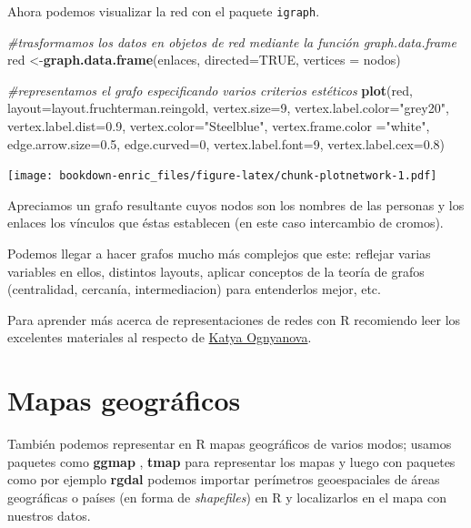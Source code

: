 \documentclass[]{book}
\newenvironment{Shaded}{\begin{snugshade}}{\end{snugshade}}
\newcommand{\KeywordTok}[1]{\textcolor[rgb]{0.13,0.29,0.53}{\textbf{{#1}}}}
\newcommand{\DataTypeTok}[1]{\textcolor[rgb]{0.13,0.29,0.53}{{#1}}}
\newcommand{\DecValTok}[1]{\textcolor[rgb]{0.00,0.00,0.81}{{#1}}}
\newcommand{\FloatTok}[1]{\textcolor[rgb]{0.00,0.00,0.81}{{#1}}}
\newcommand{\StringTok}[1]{\textcolor[rgb]{0.31,0.60,0.02}{{#1}}}
\newcommand{\CommentTok}[1]{\textcolor[rgb]{0.56,0.35,0.01}{\textit{{#1}}}}
\newcommand{\OtherTok}[1]{\textcolor[rgb]{0.56,0.35,0.01}{{#1}}}
\newcommand{\NormalTok}[1]{{#1}}
\theoremstyle{definition}
\theoremstyle{definition}
\theoremstyle{remark}
\begin{document}
Ahora podemos visualizar la red con el paquete \texttt{igraph}.

\begin{Shaded}
\begin{Highlighting}[]
\CommentTok{#trasformamos los datos en objetos de red mediante la función graph.data.frame}
\NormalTok{red <-}\KeywordTok{graph.data.frame}\NormalTok{(enlaces, }\DataTypeTok{directed=}\OtherTok{TRUE}\NormalTok{, }\DataTypeTok{vertices =} \NormalTok{nodos)}

\CommentTok{#representamos el grafo especificando varios criterios estéticos}
\KeywordTok{plot}\NormalTok{(red, }\DataTypeTok{layout=}\NormalTok{layout.fruchterman.reingold, }\DataTypeTok{vertex.size=}\DecValTok{9}\NormalTok{, }
     \DataTypeTok{vertex.label.color=}\StringTok{"grey20"}\NormalTok{, }\DataTypeTok{vertex.label.dist=}\FloatTok{0.9}\NormalTok{, }
     \DataTypeTok{vertex.color=}\StringTok{"Steelblue"}\NormalTok{, }\DataTypeTok{vertex.frame.color =}\StringTok{"white"}\NormalTok{, }
     \DataTypeTok{edge.arrow.size=}\FloatTok{0.5}\NormalTok{, }\DataTypeTok{edge.curved=}\DecValTok{0}\NormalTok{, }\DataTypeTok{vertex.label.font=}\DecValTok{9}\NormalTok{, }
     \DataTypeTok{vertex.label.cex=}\FloatTok{0.8}\NormalTok{)}
\end{Highlighting}
\end{Shaded}

\texttt{[image: bookdown-enric\_files/figure-latex/chunk-plotnetwork-1.pdf]}

Apreciamos un grafo resultante cuyos nodos son los nombres de las
personas y los enlaces los vínculos que éstas establecen (en este caso
intercambio de cromos).

Podemos llegar a hacer grafos mucho más complejos que este: reflejar
varias variables en ellos, distintos layouts, aplicar conceptos de la
teoría de grafos (centralidad, cercanía, intermediacion) para
entenderlos mejor, etc.

Para aprender más acerca de representaciones de redes con R recomiendo
leer los excelentes materiales al respecto de
\href{http://kateto.net/}{Katya Ognyanova}.

\section{Mapas geográficos}\label{mapas-geograficos}

También podemos representar en R mapas geográficos de varios modos;
usamos paquetes como \textbf{ggmap} \citep{R-ggmap}, \textbf{tmap}
\citep{R-tmap} para representar los mapas y luego con paquetes como por
ejemplo \textbf{rgdal} \citep{R-rgdal} podemos importar perímetros
geoespaciales de áreas geográficas o países (en forma de
\emph{shapefiles}) en R y localizarlos en el mapa con nuestros datos.
\end{document}
